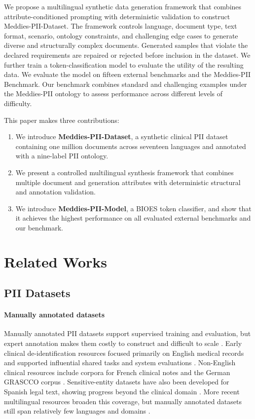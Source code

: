 \documentclass[11pt]{article}
\begin{document}
We propose a multilingual synthetic data generation framework that combines attribute-conditioned prompting with deterministic validation to construct Meddies-PII-Dataset. The framework controls language, document type, text format, scenario, ontology constraints, and challenging edge cases to generate diverse and structurally complex documents. Generated samples that violate the declared requirements are repaired or rejected before inclusion in the dataset. We further train a token-classification model to evaluate the utility of the resulting data. We evaluate the model on fifteen external benchmarks and the Meddies-PII Benchmark. Our benchmark combines standard and challenging examples under the Meddies-PII ontology to assess performance across different levels of difficulty.

This paper makes three contributions:
\begin{enumerate}
\item We introduce \textbf{Meddies-PII-Dataset}, a synthetic clinical PII dataset containing one million documents across seventeen languages and annotated with a nine-label PII ontology.
\item We present a controlled multilingual synthesis framework that combines multiple document and generation attributes with deterministic structural and annotation validation.
\item We introduce \textbf{Meddies-PII-Model}, a BIOES token classifier, and show that it achieves the highest performance on all evaluated external benchmarks and our benchmark.
\end{enumerate}

\section{Related Works}

\subsection{PII Datasets}

\paragraph{Manually annotated datasets} Manually annotated PII datasets support supervised training and evaluation, but expert annotation makes them costly to construct and difficult to scale \cite{deleger2014preparing}. Early clinical de-identification resources focused primarily on English medical records and supported influential shared tasks and system evaluations \cite{neamatullah2008automated,uzuner2007evaluating,stubbs2015automated}. Non-English clinical resources include corpora for French clinical notes and the German GRASCCO corpus \cite{grouin2014identification,modersohn2022grascco}. Sensitive-entity datasets have also been developed for Spanish legal text, showing progress beyond the clinical domain \cite{de-gibert-bonet-etal-2022-spanish}. More recent multilingual resources broaden this coverage, but manually annotated datasets still span relatively few languages and domains \cite{baroud2026multigrascco}.
\end{document}
